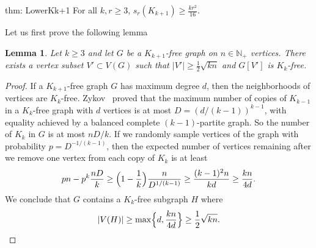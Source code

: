 \documentclass[12pt]{article}
\newtheorem{lemma}{Lemma}
\theoremstyle{definition}
\begin{document}
	\begin{reptheorem}{thm: LowerKk+1}
		For all $k,r \geq 3$, $s_r(K_{k+1}) \geq \frac{kr^2}{16}$.
	\end{reptheorem}
	Let us first prove the following lemma 
	\begin{lemma}\label{lemma: ErdosRogersK}
		Let $k\geq 3$ and let $G$ be a $K_{k+1}$\textit{-free} graph on $n \in \mathbb{N}_{+}$ vertices. There exists a vertex subset $V' \subset V(G)$ such that $|V'| \geq \frac{1}{2}\sqrt{kn}$ and $G[V']$ is $K_{k}$\textit{-free}.
	\end{lemma}
	\begin{proof}
		If a $K_{k+1}$-free graph $G$ has maximum degree $d$, then 
		the neighborhoods of vertices are $K_k$-free. Zykov~\cite{Zykov} proved that the maximum number of copies of $K_{k - 1}$ in a $K_k$-free 
		graph with $d$ vertices is at most $D = (d/(k - 1))^{k - 1}$, with equality achieved by a balanced complete $(k - 1)$-partite graph. So the number of $K_k$ 
		in $G$ is at most $nD/k$. If we randomly sample vertices of the graph with probability $p = D^{-1/(k - 1)}$, then 
		the expected number of vertices remaining after we remove one vertex from each copy of $K_k$ is at least 
		\[ pn - p^k\frac{nD}{k} \geq \Bigl(1 - \frac{1}{k}\Bigr) \frac{n}{D^{1/(k - 1)}} \geq \frac{(k - 1)^2 n}{kd} \geq \frac{kn}{4d}.\] 
		We conclude that $G$ contains a $K_k$-free subgraph $H$ where
		\[ |V(H)| \geq \max\Bigl\{d,\frac{kn}{4d}\Bigr\} \geq \frac{1}{2}\sqrt{kn}.\]
	\end{proof}
\end{document}
